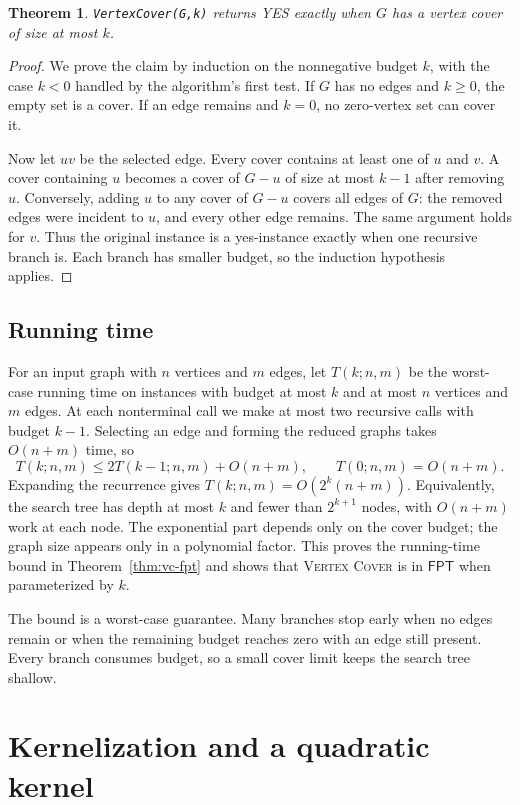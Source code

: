 \documentclass[11pt]{article}
\newtheorem{theorem}{Theorem}[section]
\newcommand{\VC}{\textsc{Vertex Cover}}
\newcommand{\FPT}{\textsf{FPT}}
\begin{document}
\begin{theorem}
\texttt{VertexCover(G,k)} returns YES exactly when $G$ has a vertex cover of size at most $k$.
\end{theorem}
\begin{proof}
We prove the claim by induction on the nonnegative budget $k$, with the case $k<0$ handled by the algorithm's first test. If $G$ has no edges and $k\geq 0$, the empty set is a cover. If an edge remains and $k=0$, no zero-vertex set can cover it.

Now let $uv$ be the selected edge. Every cover contains at least one of $u$ and $v$. A cover containing $u$ becomes a cover of $G-u$ of size at most $k-1$ after removing $u$. Conversely, adding $u$ to any cover of $G-u$ covers all edges of $G$: the removed edges were incident to $u$, and every other edge remains. The same argument holds for $v$. Thus the original instance is a yes-instance exactly when one recursive branch is. Each branch has smaller budget, so the induction hypothesis applies.
\end{proof}

\subsection{Running time}

For an input graph with $n$ vertices and $m$ edges, let $T(k;n,m)$ be the worst-case running time on instances with budget at most $k$ and at most $n$ vertices and $m$ edges. At each nonterminal call we make at most two recursive calls with budget $k-1$. Selecting an edge and forming the reduced graphs takes $O(n+m)$ time, so
\[
T(k;n,m)\leq 2T(k-1;n,m)+O(n+m),\qquad T(0;n,m)=O(n+m).
\]
Expanding the recurrence gives $T(k;n,m)=O(2^k(n+m))$. Equivalently, the search tree has depth at most $k$ and fewer than $2^{k+1}$ nodes, with $O(n+m)$ work at each node. The exponential part depends only on the cover budget; the graph size appears only in a polynomial factor. This proves the running-time bound in Theorem~\ref{thm:vc-fpt} and shows that \VC{} is in $\FPT$ when parameterized by $k$.

The bound is a worst-case guarantee. Many branches stop early when no edges remain or when the remaining budget reaches zero with an edge still present. Every branch consumes budget, so a small cover limit keeps the search tree shallow.

\section{Kernelization and a quadratic kernel}
\end{document}
